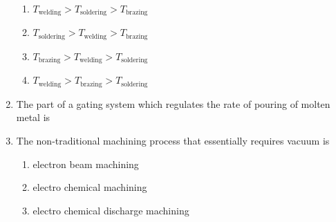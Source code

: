 \documentclass[journal,11pt,onecolumn]{IEEEtran}
\begin{document}
\begin{enumerate}
          \begin{enumerate}

              \item $T_{\text{welding}} > T_{\text{soldering}} > T_{\text{brazing}}$

              \item $T_{\text{soldering}} > T_{\text{welding}} > T_{\text{brazing}}$

              \item $T_{\text{brazing}} > T_{\text{welding}} > T_{\text{soldering}}$

              \item $T_{\text{welding}} > T_{\text{brazing}} > T_{\text{soldering}}$

          \end{enumerate}

    \item The part of a gating system which regulates the rate of pouring of molten metal is

          \begin{enumerate}


          \end{enumerate}

    \item The non-traditional machining process that essentially requires vacuum is

          \begin{enumerate}

              \item electron beam machining

              \item electro chemical machining

              \item electro chemical discharge machining


\end{enumerate}
\end{enumerate}
\end{document}

